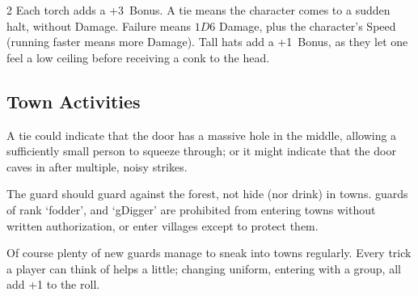 \begin{multicols}{2}
%
Each \gls{torch} adds a +3~Bonus.
A tie means the character comes to a sudden halt, without Damage.
Failure means $1D6$ Damage, plus the character's Speed (running faster means more Damage).
Tall hats add a +1~Bonus, as they let one feel a low ceiling before receiving a conk to the head.

\subsection{Town Activities}

A tie could indicate that the door has a massive hole in the middle, allowing a sufficiently small person to squeeze through; or it might indicate that the door caves in after multiple, noisy strikes.

The \gls{guard} should guard against the forest, not hide (nor drink) in towns.
\Glspl{guard} of rank `\gls{fodder}', and `\gls{gDigger}' are prohibited from entering towns without written authorization, or enter \glspl{village} except to protect them.

Of course plenty of new \glspl{guard} manage to sneak into towns regularly.
Every trick a player can think of helps a little; changing uniform, entering with a group, all add +1 to the roll.

\end{multicols}
